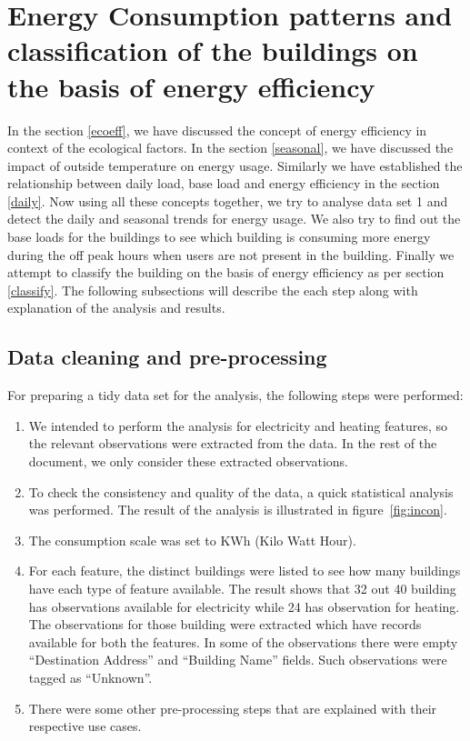\section{Energy Consumption patterns and classification of the buildings on the basis of energy efficiency}
In the section \ref{ecoeff}, we have discussed the concept of energy efficiency in context of the ecological factors. In the section \ref{seasonal}, we have discussed the impact of outside temperature on energy usage. Similarly we have established the relationship between daily load, base load and energy efficiency in the section \ref{daily}. Now using all these concepts together, we try to analyse data set 1 and detect the daily and seasonal trends for energy usage. We also try to find out the base loads for the buildings to see which building is consuming more energy during the off peak hours when users are not present in the building. Finally we attempt to classify the building on the basis of energy efficiency as per section \ref{classify}. The following subsections will describe the each step along with explanation of the analysis and results.
\subsection{Data cleaning and pre-processing} \label{cleaning}
For preparing a tidy data set for the analysis, the following steps were performed:
\begin{enumerate}
\item We intended to perform the analysis for electricity and heating features, so the relevant observations were extracted from the data. In the rest of the document, we only consider these extracted observations.
\item To check the consistency and quality of the data, a quick statistical analysis was performed. The result of the analysis is illustrated in figure~\ref{fig:incon}.
\item The consumption scale was set to KWh (Kilo Watt Hour).
\item For each feature, the distinct buildings were listed to see how many buildings have each type of feature available. The result shows that 32 out 40 building has observations available for electricity while 24 has observation for heating. The observations for those building were extracted which have records available for both the features. In some of the observations there were empty ``Destination Address'' and ``Building Name'' fields. Such observations were tagged as ``Unknown''. 
\item There were some other pre-processing steps that are explained with their respective use cases.
\end{enumerate}

